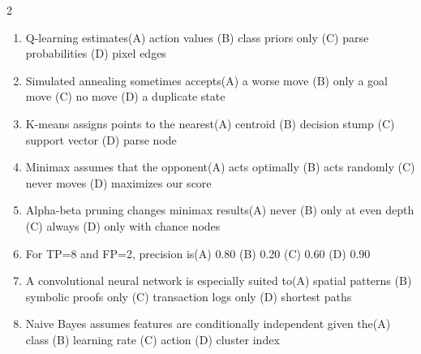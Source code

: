 \documentclass[a4paper]{article}
\begin{document}
\begin{multicols*}{2}
\begin{enumerate}
\item Q-learning estimates\newline\hspace*{0.6em}(A) action values \quad (B) class priors only \newline\hspace*{0.6em}(C) parse probabilities \quad (D) pixel edges
\item Simulated annealing sometimes accepts\newline\hspace*{0.6em}(A) a worse move \quad (B) only a goal move \newline\hspace*{0.6em}(C) no move \quad (D) a duplicate state
\item K-means assigns points to the nearest\newline\hspace*{0.6em}(A) centroid \quad (B) decision stump \newline\hspace*{0.6em}(C) support vector \quad (D) parse node
\item Minimax assumes that the opponent\newline\hspace*{0.6em}(A) acts optimally \quad (B) acts randomly \newline\hspace*{0.6em}(C) never moves \quad (D) maximizes our score
\item Alpha-beta pruning changes minimax results\newline\hspace*{0.6em}(A) never \quad (B) only at even depth \newline\hspace*{0.6em}(C) always \quad (D) only with chance nodes
\item For TP=8 and FP=2, precision is\newline\hspace*{0.6em}(A) 0.80 \quad (B) 0.20 \newline\hspace*{0.6em}(C) 0.60 \quad (D) 0.90
\item A convolutional neural network is especially suited to\newline\hspace*{0.6em}(A) spatial patterns \quad (B) symbolic proofs only \newline\hspace*{0.6em}(C) transaction logs only \quad (D) shortest paths
\item Naive Bayes assumes features are conditionally independent given the\newline\hspace*{0.6em}(A) class \quad (B) learning rate \newline\hspace*{0.6em}(C) action \quad (D) cluster index

\end{enumerate}
\end{multicols*}
\end{document}
